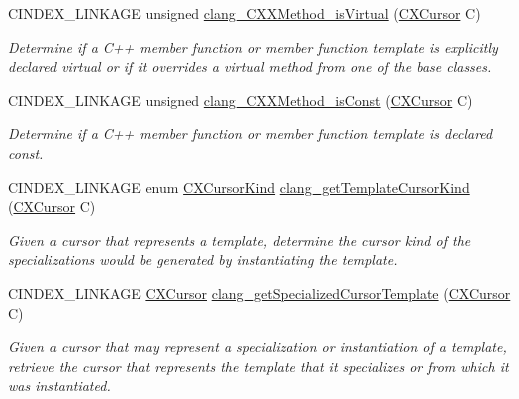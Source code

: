 \begin{DoxyCompactItemize}
\mbox{\label{group__CINDEX__CPP_gacd412f761b0622d6ea873f2ab21812e3}} 
C\+I\+N\+D\+E\+X\+\_\+\+L\+I\+N\+K\+A\+GE unsigned \hyperlink{group__CINDEX__CPP_gacd412f761b0622d6ea873f2ab21812e3}{clang\+\_\+\+C\+X\+X\+Method\+\_\+is\+Virtual} (\hyperlink{structCXCursor}{C\+X\+Cursor} C)
\begin{DoxyCompactList}\small\item\em Determine if a C++ member function or member function template is explicitly declared \textquotesingle{}virtual\textquotesingle{} or if it overrides a virtual method from one of the base classes. \end{DoxyCompactList}\item 
\mbox{\label{group__CINDEX__CPP_ga89a96f6eaae57508edc968611ac8969e}} 
C\+I\+N\+D\+E\+X\+\_\+\+L\+I\+N\+K\+A\+GE unsigned \hyperlink{group__CINDEX__CPP_ga89a96f6eaae57508edc968611ac8969e}{clang\+\_\+\+C\+X\+X\+Method\+\_\+is\+Const} (\hyperlink{structCXCursor}{C\+X\+Cursor} C)
\begin{DoxyCompactList}\small\item\em Determine if a C++ member function or member function template is declared \textquotesingle{}const\textquotesingle{}. \end{DoxyCompactList}\item 
C\+I\+N\+D\+E\+X\+\_\+\+L\+I\+N\+K\+A\+GE enum \hyperlink{group__CINDEX_gaaccc432245b4cd9f2d470913f9ef0013}{C\+X\+Cursor\+Kind} \hyperlink{group__CINDEX__CPP_gafe1f32ddd935c20f0f455d47c05ec5ab}{clang\+\_\+get\+Template\+Cursor\+Kind} (\hyperlink{structCXCursor}{C\+X\+Cursor} C)
\begin{DoxyCompactList}\small\item\em Given a cursor that represents a template, determine the cursor kind of the specializations would be generated by instantiating the template. \end{DoxyCompactList}\item 
C\+I\+N\+D\+E\+X\+\_\+\+L\+I\+N\+K\+A\+GE \hyperlink{structCXCursor}{C\+X\+Cursor} \hyperlink{group__CINDEX__CPP_gad3f78435e7ee316b3d9e704c9d42ec4b}{clang\+\_\+get\+Specialized\+Cursor\+Template} (\hyperlink{structCXCursor}{C\+X\+Cursor} C)
\begin{DoxyCompactList}\small\item\em Given a cursor that may represent a specialization or instantiation of a template, retrieve the cursor that represents the template that it specializes or from which it was instantiated. \end{DoxyCompactList}\item 

\end{DoxyCompactItemize}
